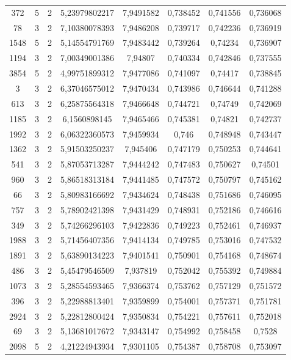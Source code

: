 \begin{longtable}{|c|c|c|c|c|c|c|c|}
372 & 5 & 2 & 5,23979802217 & 7,9491582 & 0,738452 & 0,741556 & 0,736068 \\
78 & 3 & 2 & 7,10380078393 & 7,9486208 & 0,739717 & 0,742236 & 0,736919 \\
1548 & 5 & 2 & 5,14554791769 & 7,9483442 & 0,739264 & 0,74234 & 0,736907 \\
1194 & 3 & 2 & 7,00349001386 & 7,94807 & 0,740334 & 0,742846 & 0,737555 \\
3854 & 5 & 2 & 4,99751899312 & 7,9477086 & 0,741097 & 0,74417 & 0,738845 \\
3 & 3 & 2 & 6,37046575012 & 7,9470434 & 0,743986 & 0,746644 & 0,741288 \\
613 & 3 & 2 & 6,25875564318 & 7,9466648 & 0,744721 & 0,74749 & 0,742069 \\
1185 & 3 & 2 & 6,1560898145 & 7,9465466 & 0,745381 & 0,74821 & 0,742737 \\
1992 & 3 & 2 & 6,06322360573 & 7,9459934 & 0,746 & 0,748948 & 0,743447 \\
1362 & 3 & 2 & 5,91503250237 & 7,945406 & 0,747179 & 0,750253 & 0,744641 \\
541 & 3 & 2 & 5,87053713287 & 7,9444242 & 0,747483 & 0,750627 & 0,74501 \\
960 & 3 & 2 & 5,86518313184 & 7,9441485 & 0,747572 & 0,750797 & 0,745162 \\
66 & 3 & 2 & 5,80983166692 & 7,9434624 & 0,748438 & 0,751686 & 0,746095 \\
757 & 3 & 2 & 5,78902421398 & 7,9431429 & 0,748931 & 0,752186 & 0,746616 \\
349 & 3 & 2 & 5,74266296103 & 7,9422836 & 0,749223 & 0,752461 & 0,746937 \\
1988 & 3 & 2 & 5,71456407356 & 7,9414134 & 0,749785 & 0,753016 & 0,747532 \\
1891 & 3 & 2 & 5,63890134223 & 7,9401541 & 0,750901 & 0,754168 & 0,748674 \\
486 & 3 & 2 & 5,45479546509 & 7,937819 & 0,752042 & 0,755392 & 0,749884 \\
1073 & 3 & 2 & 5,28554593465 & 7,9366374 & 0,753762 & 0,757129 & 0,751572 \\
396 & 3 & 2 & 5,22988813401 & 7,9359899 & 0,754001 & 0,757371 & 0,751781 \\
2924 & 3 & 2 & 5,22812800424 & 7,9350834 & 0,754221 & 0,757611 & 0,752018 \\
69 & 3 & 2 & 5,13681017672 & 7,9343147 & 0,754992 & 0,758458 & 0,7528 \\
2098 & 5 & 2 & 4,21224943934 & 7,9301105 & 0,754387 & 0,758708 & 0,753097 \\

\end{longtable}
